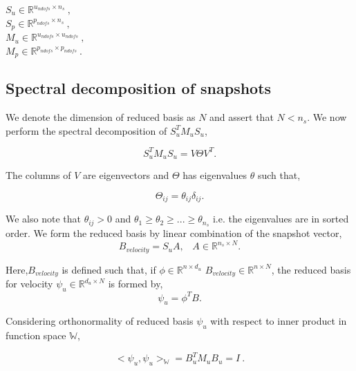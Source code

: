 \documentclass[graybox]{svmult}
\begin{document}
\begin{center}

$S_u \in \mathbb{R}^{u_{ndofs} \times n_s} \ ,$\\
$S_p \in \mathbb{R}^{p_{ndofs} \times n_s} \ ,$\\
$M_u \in \mathbb{R}^{u_{ndofs} \times u_{ndofs}} \ ,$\\
$M_p \in \mathbb{R}^{p_{ndofs} \times p_{ndofs}} \ .$\\

\end{center}

\subsection{Spectral decomposition of snapshots}

We denote the dimension of reduced basis as $N$ and assert that $N < n_s$. We now perform the spectral decomposition of $S_u^TM_uS_u$,

\begin{equation}
S_u^TM_uS_u = V \Theta V^T \textrm{.}
\end{equation}

The columns of $V$ are eigenvectors and $\Theta$ has eigenvalues $\theta$ such that,

\begin{equation}
\Theta_{ij} = \theta_{ij} \delta_{ij} \textrm{.}
\end{equation}

We also note that $\theta_{ij} > 0$ and $\theta_1 \geq \theta_2 \geq ... \geq \theta_{n_s}$ i.e. the eigenvalues are in sorted order. We form the reduced basis by linear combination of the snapshot vector,
\begin{equation}
B_{velocity} = S_u A \textrm{,} \quad A \in \mathbb{R}^{n_s \times N} \textrm{.}
\end{equation}

Here,$B_{velocity}$ is defined such that, if $\phi \in \mathbb{R}^{n \times d_u}$ $B_{velocity} \in \mathbb{R}^{n \times N}$, the reduced basis for velocity $\psi_u \in \mathbb{R}^{d_u \times N}$ is formed by,
\begin{equation}
\psi_u = \phi^T B \textrm{.}
\end{equation}

Considering orthonormality of reduced basis $\psi_u$ with respect to inner product in function space $\mathbb{W}$,

\begin{equation}
<\psi_u , \psi_u>_{\mathbb{W}} = B_u^T M_{u} B_u = I \ .
\end{equation}
\end{document}
